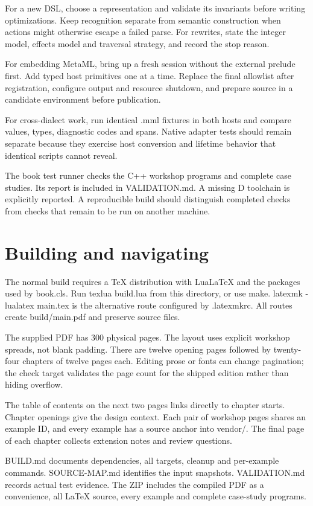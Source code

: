 For a new DSL, choose a representation and validate its invariants before writing optimizations. Keep recognition separate from semantic construction when actions might otherwise escape a failed parse. For rewrites, state the integer model, effects model and traversal strategy, and record the stop reason.

For embedding MetaML, bring up a fresh session without the external prelude first. Add typed host primitives one at a time. Replace the final allowlist after registration, configure output and resource shutdown, and prepare source in a candidate environment before publication.

For cross-dialect work, run identical .mml fixtures in both hosts and compare values, types, diagnostic codes and spans. Native adapter tests should remain separate because they exercise host conversion and lifetime behavior that identical scripts cannot reveal.

The book test runner checks the C++ workshop programs and complete case studies. Its report is included in VALIDATION.md. A missing D toolchain is explicitly reported. A reproducible build should distinguish completed checks from checks that remain to be run on another machine.

\clearpage
\section*{Building and navigating}
The normal build requires a TeX distribution with LuaLaTeX and the packages used by book.cls. Run texlua build.lua from this directory, or use make. latexmk -lualatex main.tex is the alternative route configured by .latexmkrc. All routes create build/main.pdf and preserve source files.

The supplied PDF has 300 physical pages. The layout uses explicit workshop spreads, not blank padding. There are twelve opening pages followed by twenty-four chapters of twelve pages each. Editing prose or fonts can change pagination; the check target validates the page count for the shipped edition rather than hiding overflow.

The table of contents on the next two pages links directly to chapter starts. Chapter openings give the design context. Each pair of workshop pages shares an example ID, and every example has a source anchor into vendor/. The final page of each chapter collects extension notes and review questions.

BUILD.md documents dependencies, all targets, cleanup and per-example commands. SOURCE-MAP.md identifies the input snapshots. VALIDATION.md records actual test evidence. The ZIP includes the compiled PDF as a convenience, all LaTeX source, every example and complete case-study programs.


